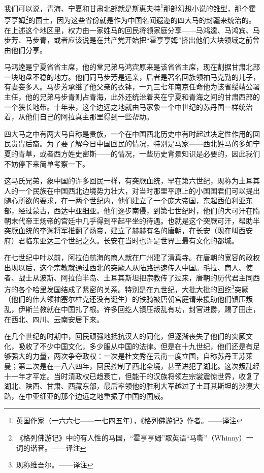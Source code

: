 \documentclass[10pt]{book}
\begin{document}
我们可以说，青海、宁夏和甘肃北部就是斯惠夫特\footnote{英国作家（一六六七——一七四五年），《格列佛游记》作者。——译注}那部幻想小说的雏型，那个霍亨亨姆\footnote{《格列佛游记》中的有人性的马国，“霍亨亨姆”取英语“马嘶”（Whinny）一词的谐音。——译注}的国土，因为这些省份就是作为中国名闻遐迩的四大马的封疆来统治的。在上述这个地区里，权力由一家姓马的回民将领家庭分享——马鸿逵、马鸿宾、马步芳、马步青，或者应该说是在共产党开始把“霍亨亨姆”挤出他们大块领域之前曾由他们分享。

马鸿逵是宁夏省省主席，他的堂兄弟马鸿宾原来是该省省主席，现在割据甘肃北部一块地盘不稳的地方。他们同马步芳是远亲，后者是著名回族领袖马克勤的儿子，有妻妾多人。马步芳承继了他父亲的衣钵，一九三七年南京任命他为该省绥靖公署主任，他的兄弟马步青则占青海，此外还统治着夹在宁夏和青海之间的甘肃西部的一个狭长地带。十年来，这个边远之地就由马家象一个中世纪的苏丹国一样统治着，从他们自己的阿拉真主那里得到一些帮助。

四大马之中有两大马自称是贵族，一个在中国西北历史中有时起过决定性作用的回民贵胄后裔。为了要了解今日中国回民的情况，特别是马家——西北姓马的多如宁夏的青草，或者西方姓史密斯——的情况，一些历史背景知识是必要的，因此我们不妨停下来简单考察一下。

这马氏兄弟，象中国的许多回民一样，有突厥血统，早在第六世纪，现称为土耳其人的一个民族在中国西北边境势力壮大，对当时那里平原上的小国国君们可以提出随心所欲的要求，在一两个世纪内，他们建立了一个庞大帝国，东起西伯利亚东部，经过蒙古，西达中亚细亚。他们逐步南侵，到第七世纪时，他们的大可汗在隋朝末代帝王炀帝的宫廷中几乎得到平起平坐的待遇。也就是这个突厥可汗，帮助半突厥血统的李渊将军推翻了炀帝，建立了赫赫有名的唐朝，在长安（现在叫西安府）君临东亚达三个世纪之久。长安在当时也许是世界上最有文化的都城。

在七世纪中叶以前，阿拉伯航海的商人就在广州建了清真寺。在唐朝的宽容的政权出现以后，这个宗教就通过西北的突厥人从陆路迅速传入中国。毛拉、商人、使者、战士从波斯、阿拉伯半岛、土耳其斯坦把宗教传了过来，唐朝的历代君主同西方的各个哈里发国结成了紧密的关系。特别是在九世纪，大批大批的回纥\footnote{现称维吾尔。——译注}突厥（他们的伟大领袖塞尔柱克还没有诞生）的铁骑被唐朝宫庭请来援助他们镇压叛乱，伊斯兰教就在中国扎了根。许多回纥人镇压叛乱有功，封官进爵，赐了田庄，在西北、四川、云南安居下来。

在几个世纪的时期中，回民顽强地抵抗汉人的同化，但逐渐丧失了他们的突厥文化，吸收了不少中国文化，多少服从中国的法律。但是在十九世纪，他们还是有足够强大的力量，两次争夺政权：一次是杜文秀在云南一度立国，自称苏丹王苏莱曼；第二次是在一八六四年，回民控制了西北全境，甚至进犯了湖北。这次叛乱经十一年才平定。当时清政权已趋衰亡，但能干的汉族将领左宗裳震惊世界，收复了湖北、陕西、甘肃、西藏东部，最后率领他的胜利大军越过了土耳其斯坦的沙漠大路，在中亚细亚的那个边远之地重振了中国的国威。
\end{document}
